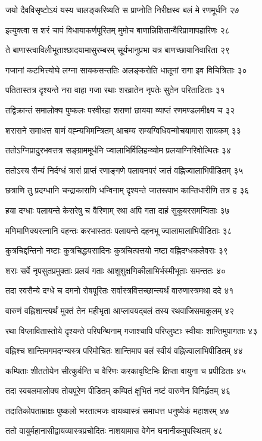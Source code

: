 जयो दैवविसृष्टोऽयं यस्य चालङ्करिष्यति
स प्राप्नोति निरीक्षस्व बलं मे रणमूर्धनि २७

इत्युक्त्वा स शरं चापं विधायाकर्णपूरितम्
मुमोच बाणान्निशितान्वैरिप्राणापहारिणः २८

ते बाणास्त्वाविलीभूताश्छादयामासुरम्बरम्
सूर्यभानुप्रभा यत्र बाणच्छायानिवारिता २९

गजानां कटभित्त्योघे लग्ना सायकसन्ततिः
अलङ्करोति धातूनां रागा इव विचित्रिताः ३०

पतितास्तत्र दृश्यन्ते नरा वाहा गजा रथाः
शरव्रातेन नृपतेः सुतेन परिताडिताः ३१

तद्विक्रान्तं समालोक्य पुष्कलः परवीरहा
शराणां छायया व्याप्तं रणमण्डलमीक्ष्य च ३२

शरासने समाधत्त बाणं वह्न्यभिमन्त्रितम्
आचम्य सम्यग्विधिवन्मोचयामास सायकम् ३३

ततोऽग्निप्रादुरभवत्तत्र सङ्ग्राममूर्धनि
ज्वालाभिर्विलिहन्व्योम प्रलयाग्निरिवोत्थितः ३४

ततोऽस्य सैन्यं निर्दग्धं त्रासं प्राप्तं रणाङ्गणे
पलायनपरं जातं वह्निज्वालाभिपीडितम् ३५

छत्राणि तु प्रदग्धानि चन्द्राकाराणि धन्विनाम्
दृश्यन्ते जातरूपाभ कान्तिधारीणि तत्र ह ३६

हया दग्धाः पलायन्ते केसरेषु च वैरिणाम्
रथा अपि गता दाहं सुकूबरसमन्विताः ३७

मणिमाणिक्यरत्नानि वहन्तः करभास्ततः
पलायन्ते दहनभू ज्वालामालाभिपीडिताः ३८

कुत्रचिद्दन्तिनो नष्टाः कुत्रचिद्धयसादिनः
कुत्रचित्पत्तयो नष्टा वह्निदग्धकलेवराः ३९

शराः सर्वे नृपसुतप्रमुक्ताः प्रलयं गताः
आशुशुक्षणिकीलाभिर्भस्मीभूताः समन्ततः ४०

तदा स्वसैन्ये दग्धे च दमनो रोषपूरितः
सर्वास्त्रवित्तच्छान्त्यर्थं वारुणास्त्रमथा ददे ४१

वारुणं वह्निशान्त्यर्थं मुक्तं तेन महीभृता
आप्लावयद्बलं तस्य रथवाजिसमाकुलम् ४२

रथा विप्लावितास्तोये दृश्यन्ते परिपन्थिनाम्
गजाश्चापि परिप्लुष्टाः स्वीयाः शान्तिमुपागताः ४३

वह्निश्च शान्तिमगमदग्न्यस्त्र परिमोचितः
शान्तिमाप बलं स्वीयं वह्निज्वालाभिपीडितम् ४४

कम्पिताः शीततोयेन सीत्कुर्वन्ति च वैरिणः
करकावृष्टिभिः क्षिप्ता वायुना च प्रपीडिताः ४५

तदा स्वबलमालोक्य तोयपूरेण पीडितम्
कम्पितं क्षुभितं नष्टं वारुणेन विनिर्हृतम् ४६

तदातिकोपताम्राक्षः पुष्कलो भरतात्मजः
वायव्यास्त्रं समाधत्त धनुष्येकं महाशरम् ४७

ततो वायुर्महानासीद्वायव्यास्त्रप्रचोदितः
नाशयामास वेगेन घनानीकमुपस्थितम् ४८

